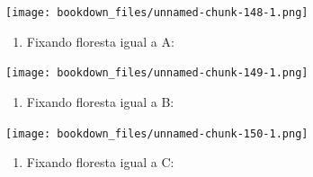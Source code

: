 \documentclass[
]{article}
\newenvironment{Shaded}{\begin{snugshade}}{\end{snugshade}}
\newcommand{\DataTypeTok}[1]{\textcolor[rgb]{0.13,0.29,0.53}{#1}}
\newcommand{\DecValTok}[1]{\textcolor[rgb]{0.00,0.00,0.81}{#1}}
\newcommand{\KeywordTok}[1]{\textcolor[rgb]{0.13,0.29,0.53}{\textbf{#1}}}
\newcommand{\NormalTok}[1]{#1}
\newcommand{\OperatorTok}[1]{\textcolor[rgb]{0.81,0.36,0.00}{\textbf{#1}}}
\newcommand{\StringTok}[1]{\textcolor[rgb]{0.31,0.60,0.02}{#1}}
\providecommand{\tightlist}{%
  \setlength{\itemsep}{0pt}\setlength{\parskip}{0pt}}
\begin{document}
\begin{Shaded}
\end{Shaded}

\texttt{[image: bookdown\_files/unnamed-chunk-148-1.png]}

\begin{enumerate}
\def\labelenumi{\arabic{enumi}.}
\setcounter{enumi}{6}
\tightlist
\item
  Fixando floresta igual a A:
\end{enumerate}

\begin{Shaded}
\end{Shaded}

\texttt{[image: bookdown\_files/unnamed-chunk-149-1.png]}

\begin{enumerate}
\def\labelenumi{\arabic{enumi}.}
\setcounter{enumi}{7}
\tightlist
\item
  Fixando floresta igual a B:
\end{enumerate}

\begin{Shaded}
\end{Shaded}

\texttt{[image: bookdown\_files/unnamed-chunk-150-1.png]}

\begin{enumerate}
\def\labelenumi{\arabic{enumi}.}
\setcounter{enumi}{8}
\tightlist
\item
  Fixando floresta igual a C:
\end{enumerate}
\end{document}
